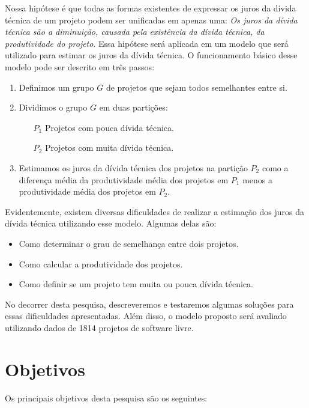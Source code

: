 Nossa hipótese é que todas as formas existentes de expressar os juros da dívida técnica de um projeto podem ser unificadas em apenas uma: \emph{Os juros da dívida técnica são a diminuição, causada pela existência da dívida técnica, da produtividade do projeto}.  Essa hipótese será aplicada em um modelo que será utilizado para estimar os juros da dívida técnica. O funcionamento básico desse modelo pode ser descrito em três passos:

\begin{enumerate}
\item Definimos um grupo $G$ de projetos que sejam todos semelhantes entre si.
\item Dividimos o grupo $G$ em duas partições: 
\begin{enumerate}
\item[$P_1$] Projetos com pouca dívida técnica.
\item[$P_2$] Projetos com muita dívida técnica.
\end{enumerate}
\item Estimamos os juros da dívida técnica dos projetos na partição $P_2$ como a diferença média da produtividade média dos projetos em $P_1$ menos a produtividade média dos projetos em $P_2$.
\end{enumerate}


Evidentemente, existem diversas dificuldades de realizar a estimação dos juros da dívida técnica utilizando esse modelo. Algumas delas são:

\begin{itemize}
\item Como determinar o grau de semelhança entre dois projetos.
\item Como calcular a produtividade dos projetos.
\item Como definir se um projeto tem muita ou pouca dívida técnica.
\end{itemize}

No decorrer desta pesquisa, descreveremos e testaremos algumas soluções para essas dificuldades apresentadas. Além disso, o modelo proposto será avaliado utilizando dados de 1814 projetos de software livre.


\section{Objetivos}
Os principais objetivos desta pesquisa são os seguintes:

